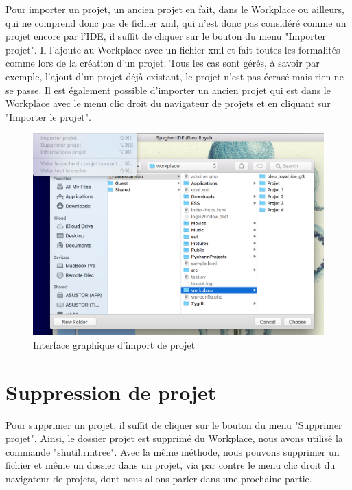 \documentclass[a4paper,12pt]{article}
\begin{document}
Pour importer un projet, un ancien projet en fait, dans le Workplace ou ailleurs, qui ne comprend donc pas de fichier xml, qui n'est donc pas considéré comme un projet encore par l'IDE, il suffit de cliquer sur le bouton du menu "Importer projet". Il l'ajoute au Workplace avec un fichier xml et fait toutes les formalités comme lors de la création d'un projet. Tous les cas sont gérés, à savoir par exemple, l'ajout d'un projet déjà existant, le projet n'est pas écrasé mais rien ne se passe. Il est également possible d'importer un ancien projet qui est dans le Workplace avec le menu clic droit du navigateur de projets et en cliquant sur "Importer le projet".

\begin{figure}[h!]
			\begin{center}
				\includegraphics[scale=0.5]{images/import.png}
				\caption{Interface graphique d'import de projet}
			\end{center}
		\end{figure}
		
\section{Suppression de projet}

Pour supprimer un projet, il suffit de cliquer sur le bouton du menu "Supprimer projet". Ainsi, le dossier projet est supprimé du Workplace, nous avons utilisé la commande "shutil.rmtree". Avec la même méthode, nous pouvons supprimer un fichier et même un dossier dans un projet, via par contre le menu clic droit du navigateur de projets, dont nous allons parler dans une prochaine partie.
\end{document}
